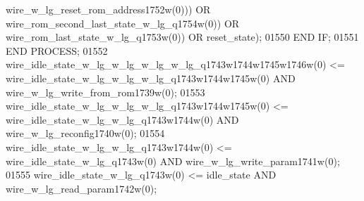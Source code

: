 \begin{DoxyCode}
{{      wire_w_lg_reset_rom_address1752w}\textcolor{vhdlchar}{(}\textcolor{vhdllogic}{}\textcolor{vhdllogic}{0}\textcolor{vhdlchar}{)}\textcolor{vhdlchar}{)}\textcolor{vhdlchar}{)} \textcolor{keywordflow}{OR} \textcolor{vhdlchar}{wire_rom_second_last_state_w_lg_q1754w}\textcolor{vhdlchar}{(}\textcolor{vhdllogic}{}\textcolor{vhdllogic}{0}\textcolor{vhdlchar}{)}\textcolor{vhdlchar}{)} \textcolor{keywordflow}{OR} \textcolor{vhdlchar}{
      wire_rom_last_state_w_lg_q1753w}\textcolor{vhdlchar}{(}\textcolor{vhdllogic}{}\textcolor{vhdllogic}{0}\textcolor{vhdlchar}{)}\textcolor{vhdlchar}{)} \textcolor{keywordflow}{OR} \textcolor{vhdlchar}{reset_state}\textcolor{vhdlchar}{)};
01550         \textcolor{keywordflow}{END} \textcolor{keywordflow}{IF};
01551     \textcolor{keywordflow}{END} \textcolor{keywordflow}{PROCESS};
01552     \textcolor{vhdlchar}{wire_idle_state_w_lg_w_lg_w_lg_w_lg_q1743w1744w1745w1746w}\textcolor{vhdlchar}{(}\textcolor{vhdllogic}{}\textcolor{vhdllogic}{0}\textcolor{vhdlchar}{)} \textcolor{vhdlchar}{<=} \textcolor{vhdlchar}{
      wire_idle_state_w_lg_w_lg_w_lg_q1743w1744w1745w}\textcolor{vhdlchar}{(}\textcolor{vhdllogic}{}\textcolor{vhdllogic}{0}\textcolor{vhdlchar}{)} \textcolor{keywordflow}{AND} \textcolor{vhdlchar}{
      wire_w_lg_write_from_rom1739w}\textcolor{vhdlchar}{(}\textcolor{vhdllogic}{}\textcolor{vhdllogic}{0}\textcolor{vhdlchar}{)};
01553     \textcolor{vhdlchar}{wire_idle_state_w_lg_w_lg_w_lg_q1743w1744w1745w}\textcolor{vhdlchar}{(}\textcolor{vhdllogic}{}\textcolor{vhdllogic}{0}\textcolor{vhdlchar}{)} \textcolor{vhdlchar}{<=} \textcolor{vhdlchar}{
      wire_idle_state_w_lg_w_lg_q1743w1744w}\textcolor{vhdlchar}{(}\textcolor{vhdllogic}{}\textcolor{vhdllogic}{0}\textcolor{vhdlchar}{)} \textcolor{keywordflow}{AND} \textcolor{vhdlchar}{wire_w_lg_reconfig1740w}\textcolor{vhdlchar}{(}\textcolor{vhdllogic}{}\textcolor{vhdllogic}{0}\textcolor{vhdlchar}{)};
01554     \textcolor{vhdlchar}{wire_idle_state_w_lg_w_lg_q1743w1744w}\textcolor{vhdlchar}{(}\textcolor{vhdllogic}{}\textcolor{vhdllogic}{0}\textcolor{vhdlchar}{)} \textcolor{vhdlchar}{<=} \textcolor{vhdlchar}{wire_idle_state_w_lg_q1743w}\textcolor{vhdlchar}{(}\textcolor{vhdllogic}{}\textcolor{vhdllogic}{0}\textcolor{vhdlchar}{)} \textcolor{keywordflow}{AND} \textcolor{vhdlchar}{
      wire_w_lg_write_param1741w}\textcolor{vhdlchar}{(}\textcolor{vhdllogic}{}\textcolor{vhdllogic}{0}\textcolor{vhdlchar}{)};
01555     \textcolor{vhdlchar}{wire_idle_state_w_lg_q1743w}\textcolor{vhdlchar}{(}\textcolor{vhdllogic}{}\textcolor{vhdllogic}{0}\textcolor{vhdlchar}{)} \textcolor{vhdlchar}{<=} \textcolor{vhdlchar}{idle_state} \textcolor{keywordflow}{AND} \textcolor{vhdlchar}{wire_w_lg_read_param1742w}\textcolor{vhdlchar}{(}\textcolor{vhdllogic}{}\textcolor{vhdllogic}{0}\textcolor{vhdlchar}{)};
}
\end{DoxyCode}
